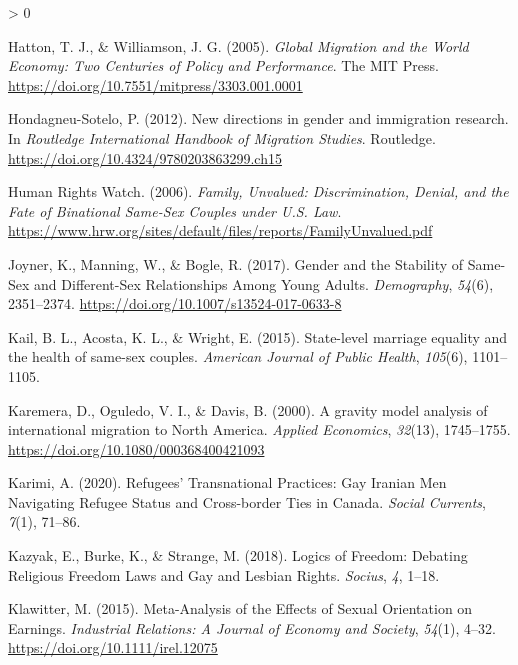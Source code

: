 \documentclass[
  11pt,
]{article}
\newlength{\cslhangindent}
\newenvironment{CSLReferences}[2] %
 {%
  \setlength{\parindent}{0pt}
  \ifodd #1 \everypar{\setlength{\hangindent}{\cslhangindent}}\ignorespaces\fi
  \ifnum #2 > 0
  \setlength{\parskip}{#2\baselineskip}
  \fi
 }%
 {}
\begin{document}
\begin{CSLReferences}{1}{0}
\leavevmode\hypertarget{ref-hatton_2005a}{}%
Hatton, T. J., \& Williamson, J. G. (2005). \emph{Global {Migration} and the {World} {Economy}: {Two} {Centuries} of {Policy} and {Performance}}. The MIT Press. \url{https://doi.org/10.7551/mitpress/3303.001.0001}

\leavevmode\hypertarget{ref-hondagneu-sotelo_2012}{}%
Hondagneu-Sotelo, P. (2012). New directions in gender and immigration research. In \emph{Routledge {International} {Handbook} of {Migration} {Studies}}. Routledge. \url{https://doi.org/10.4324/9780203863299.ch15}

\leavevmode\hypertarget{ref-humanrightswatch_2006}{}%
Human Rights Watch. (2006). \emph{Family, {Unvalued}: {Discrimination}, {Denial}, and the {Fate} of {Binational} {Same}-{Sex} {Couples} under {U}.{S}. {Law}}. \url{https://www.hrw.org/sites/default/files/reports/FamilyUnvalued.pdf}

\leavevmode\hypertarget{ref-joyner_2017}{}%
Joyner, K., Manning, W., \& Bogle, R. (2017). Gender and the {Stability} of {Same}-{Sex} and {Different}-{Sex} {Relationships} {Among} {Young} {Adults}. \emph{Demography}, \emph{54}(6), 2351--2374. \url{https://doi.org/10.1007/s13524-017-0633-8}

\leavevmode\hypertarget{ref-kail_2015}{}%
Kail, B. L., Acosta, K. L., \& Wright, E. (2015). State-level marriage equality and the health of same-sex couples. \emph{American Journal of Public Health}, \emph{105}(6), 1101--1105.

\leavevmode\hypertarget{ref-karemera_2000}{}%
Karemera, D., Oguledo, V. I., \& Davis, B. (2000). A gravity model analysis of international migration to {North} {America}. \emph{Applied Economics}, \emph{32}(13), 1745--1755. \url{https://doi.org/10.1080/000368400421093}

\leavevmode\hypertarget{ref-karimi_2020}{}%
Karimi, A. (2020). Refugees' {Transnational} {Practices}: {Gay} {Iranian} {Men} {Navigating} {Refugee} {Status} and {Cross}-border {Ties} in {Canada}. \emph{Social Currents}, \emph{7}(1), 71--86.

\leavevmode\hypertarget{ref-kazyak_2018}{}%
Kazyak, E., Burke, K., \& Strange, M. (2018). Logics of {Freedom}: {Debating} {Religious} {Freedom} {Laws} and {Gay} and {Lesbian} {Rights}. \emph{Socius}, \emph{4}, 1--18.

\leavevmode\hypertarget{ref-klawitter_2015}{}%
Klawitter, M. (2015). Meta-{Analysis} of the {Effects} of {Sexual} {Orientation} on {Earnings}. \emph{Industrial Relations: A Journal of Economy and Society}, \emph{54}(1), 4--32. \url{https://doi.org/10.1111/irel.12075}


\end{CSLReferences}
\end{document}
